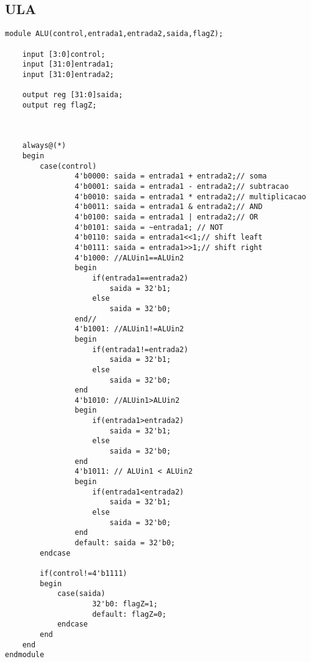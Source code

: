 \subsection{ULA}
\begin{lstlisting}
module ALU(control,entrada1,entrada2,saida,flagZ);
	
	input [3:0]control;
	input [31:0]entrada1;
	input [31:0]entrada2;
	
	output reg [31:0]saida;
	output reg flagZ;

	
	
	always@(*)
	begin
		case(control)
				4'b0000: saida = entrada1 + entrada2;// soma	
				4'b0001: saida = entrada1 - entrada2;// subtracao
				4'b0010: saida = entrada1 * entrada2;// multiplicacao
				4'b0011: saida = entrada1 & entrada2;// AND
				4'b0100: saida = entrada1 | entrada2;// OR
				4'b0101: saida = ~entrada1; // NOT
				4'b0110: saida = entrada1<<1;// shift leaft 
				4'b0111: saida = entrada1>>1;// shift right
				4'b1000: //ALUin1==ALUin2 
				begin
					if(entrada1==entrada2)
						saida = 32'b1;
					else
						saida = 32'b0;
				end//
				4'b1001: //ALUin1!=ALUin2 
				begin
					if(entrada1!=entrada2)
						saida = 32'b1;
					else
						saida = 32'b0;
				end
				4'b1010: //ALUin1>ALUin2
				begin
					if(entrada1>entrada2)
						saida = 32'b1;
					else
						saida = 32'b0;
				end
				4'b1011: // ALUin1 < ALUin2
				begin
					if(entrada1<entrada2)
						saida = 32'b1;
					else
						saida = 32'b0;
				end
				default: saida = 32'b0;
		endcase
		
		if(control!=4'b1111)
		begin
			case(saida)
					32'b0: flagZ=1;
					default: flagZ=0;
			endcase
		end
	end
endmodule

\end{lstlisting}
\clearpage

